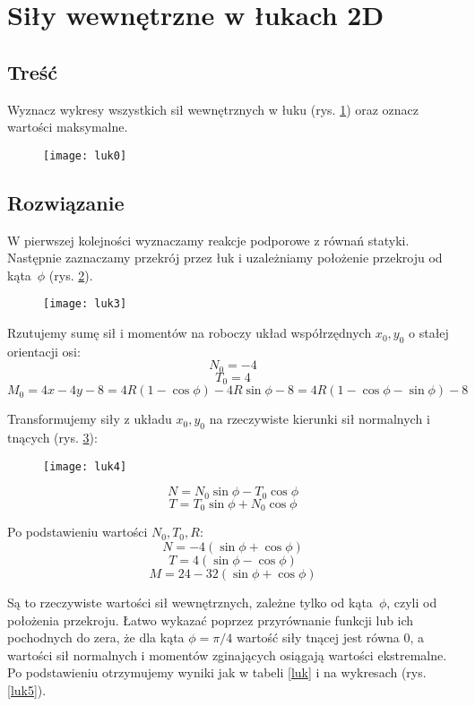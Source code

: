 \documentclass[a4paper,11pt]{article}
\begin{document}
\section{Siły wewnętrzne w łukach 2D}
\subsection{Treść}
Wyznacz wykresy wszystkich sił wewnętrznych w łuku (rys. \ref{luk0}) oraz oznacz wartości maksymalne.

\begin{figure}[tbh]\centering
	\texttt{[image: luk0]}
	\caption{}
	\label{luk0}
\end{figure}

\subsection{Rozwiązanie}
W pierwszej kolejności wyznaczamy reakcje podporowe z równań statyki. Następnie zaznaczamy przekrój przez łuk i uzależniamy położenie przekroju od kąta~$\phi$ (rys. \ref{luk3}).

\begin{figure}[tbh]\centering
	\texttt{[image: luk3]}
	\caption{}
	\label{luk3}
\end{figure}

Rzutujemy sumę sił i momentów na roboczy układ współrzędnych $x_0, y_0$ o stałej orientacji osi:
\[ N_0 = -4 \]
\[ T_0 = 4 \]
\[ M_0 = 4x - 4y -8 = 4R(1-\cos\phi) -4R\sin\phi -8 = 4R(1-\cos\phi-\sin\phi) -8 \]

Transformujemy siły z układu $x_0, y_0$ na rzeczywiste kierunki sił normalnych i tnących (rys. \ref{luk4}):
\begin{figure}[tbh]\centering
	\texttt{[image: luk4]}
	\caption{}
	\label{luk4}
\end{figure}

\[ N = N_0\sin\phi - T_0\cos\phi \]
\[ T = T_0\sin\phi + N_0\cos\phi \]

Po podstawieniu wartości $N_0, T_0, R$:
\[ N = -4(\sin\phi +\cos\phi) \]
\[ T = 4(\sin\phi -\cos\phi) \]
\[ M = 24 - 32(\sin\phi+\cos\phi) \]

Są to rzeczywiste wartości sił wewnętrznych, zależne tylko od kąta~$\phi$, czyli od położenia przekroju. Łatwo wykazać poprzez przyrównanie funkcji lub ich pochodnych do zera, że dla kąta $\phi=\pi/4$ wartość siły tnącej jest równa 0, a wartości sił normalnych i momentów zginających osiągają wartości ekstremalne. Po podstawieniu otrzymujemy wyniki jak w tabeli \ref{luk} i na wykresach (rys. \ref{luk5}).
\end{document}
